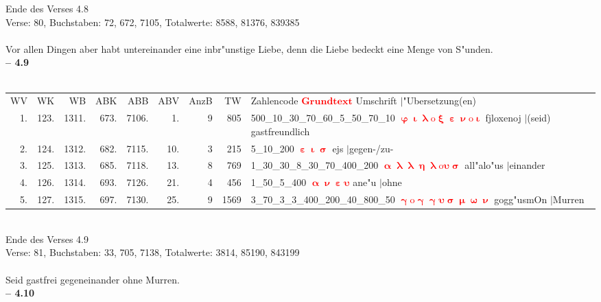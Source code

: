 \documentclass[a4paper,10pt,landscape]{article}
\begin{document}
Ende des Verses 4.8\\
Verse: 80, Buchstaben: 72, 672, 7105, Totalwerte: 8588, 81376, 839385\\
\\
Vor allen Dingen aber habt untereinander eine inbr"unstige Liebe, denn die Liebe bedeckt eine Menge von S"unden.\\
\newpage 
{\bf -- 4.9}\\
\medskip \\
\begin{tabular}{rrrrrrrrp{120mm}}
WV&WK&WB&ABK&ABB&ABV&AnzB&TW&Zahlencode \textcolor{red}{$\boldsymbol{Grundtext}$} Umschrift $|$"Ubersetzung(en)\\
1.&123.&1311.&673.&7106.&1.&9&805&500\_10\_30\_70\_60\_5\_50\_70\_10 \textcolor{red}{$\boldsymbol{\upvarphi\upiota\uplambda\mathrm{o}\upxi\upepsilon\upnu\mathrm{o}\upiota}$} fjloxenoj $|$(seid) gastfreundlich\\
2.&124.&1312.&682.&7115.&10.&3&215&5\_10\_200 \textcolor{red}{$\boldsymbol{\upepsilon\upiota\upsigma}$} ejs $|$gegen-/zu-\\
3.&125.&1313.&685.&7118.&13.&8&769&1\_30\_30\_8\_30\_70\_400\_200 \textcolor{red}{$\boldsymbol{\upalpha\uplambda\uplambda\upeta\uplambda\mathrm{o}\upsilon\upsigma}$} all"alo"us $|$einander\\
4.&126.&1314.&693.&7126.&21.&4&456&1\_50\_5\_400 \textcolor{red}{$\boldsymbol{\upalpha\upnu\upepsilon\upsilon}$} ane"u $|$ohne\\
5.&127.&1315.&697.&7130.&25.&9&1569&3\_70\_3\_3\_400\_200\_40\_800\_50 \textcolor{red}{$\boldsymbol{\upgamma\mathrm{o}\upgamma\upgamma\upsilon\upsigma\upmu\upomega\upnu}$} gogg"usmOn $|$Murren\\
\end{tabular}\medskip \\
Ende des Verses 4.9\\
Verse: 81, Buchstaben: 33, 705, 7138, Totalwerte: 3814, 85190, 843199\\
\\
Seid gastfrei gegeneinander ohne Murren.\\
\newpage 
{\bf -- 4.10}\\
\medskip \\
\end{document}
